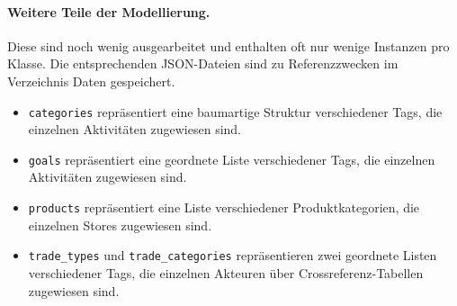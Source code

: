 \documentclass[a4paper,11pt]{article}
\begin{document}
\paragraph{Weitere Teile der Modellierung.}
Diese sind noch wenig ausgearbeitet und enthalten oft nur wenige Instanzen pro
Klasse. Die entsprechenden JSON-Dateien sind zu Referenzzwecken im Verzeichnis
Daten gespeichert.
\begin{itemize}\itemsep0pt
\item \texttt{categories} repräsentiert eine baumartige Struktur verschiedener
  Tags, die einzelnen Aktivitäten zugewiesen sind.
\item \texttt{goals} repräsentiert eine geordnete Liste verschiedener Tags,
  die einzelnen Aktivitäten zugewiesen sind.
\item \texttt{products} repräsentiert eine Liste verschiedener
  Produktkategorien, die einzelnen Stores zugewiesen sind.
\item \texttt{trade\_types} und \texttt{trade\_categories} repräsentieren zwei
  geordnete Listen verschiedener Tags, die einzelnen Akteuren über 
  Crossreferenz-Tabellen zugewiesen sind.
\end{itemize}
\end{document}
